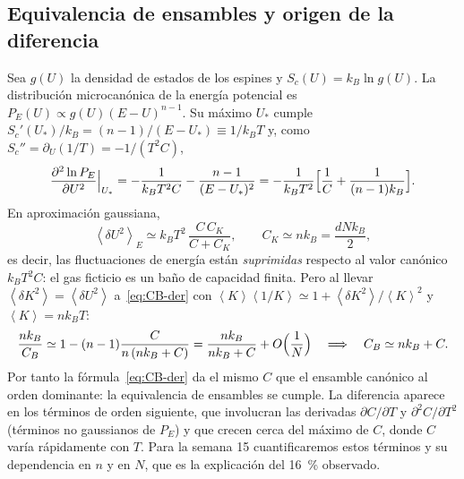 \documentclass[11pt,letterpaper]{article}
\newcommand{\avg}[1]{\left\langle #1 \right\rangle}
\newcommand{\kB}{k_{B}}
\begin{document}
\subsection{Equivalencia de ensambles y origen de la diferencia}
\label{sec:equiv}
Sea $g(U)$ la densidad de estados de los espines y $S_c(U)=\kB\ln g(U)$. La
distribución microcanónica de la energía potencial es
$P_E(U)\propto g(U)(E-U)^{n-1}$. Su máximo $U_*$ cumple
$S_c'(U_*)/\kB=(n-1)/(E-U_*)\equiv1/\kB T$ y, como $S_c''=\partial_U(1/T)=-1/(T^2C)$,
\begin{equation}
\frac{\partial^2\ln P_E}{\partial U^2}\Big|_{U_*}=-\frac{1}{\kB T^2C}-\frac{n-1}{(E-U_*)^2}
=-\frac{1}{\kB T^2}\Bigl[\frac1C+\frac{1}{(n-1)\kB}\Bigr].
\end{equation}
En aproximación gaussiana,
\begin{equation}
\avg{\delta U^2}_E\simeq\kB T^2\,\frac{C\,C_K}{C+C_K},\qquad C_K\simeq n\kB=\frac{dN\kB}{2},
\label{eq:dU2}
\end{equation}
es decir, las fluctuaciones de energía están \emph{suprimidas} respecto al valor
canónico $\kB T^2C$: el gas ficticio es un baño de capacidad finita. Pero al llevar
$\avg{\delta K^2}=\avg{\delta U^2}$ a~\eqref{eq:CB-der} con
$\avg K\avg{1/K}\simeq1+\avg{\delta K^2}/\avg K^2$ y $\avg K=n\kB T$:
\begin{equation}
\frac{n\kB}{C_B}\simeq1-(n-1)\frac{C}{n\,(n\kB+C)}=\frac{n\kB}{n\kB+C}+O\Bigl(\frac1N\Bigr)
\quad\Longrightarrow\quad C_B\simeq n\kB+C .
\end{equation}
Por tanto la fórmula~\eqref{eq:CB-der} da el mismo $C$ que el ensamble canónico al
orden dominante: la equivalencia de ensambles se cumple. La diferencia aparece en los
términos de orden siguiente, que involucran las derivadas $\partial C/\partial T$ y
$\partial^2C/\partial T^2$ (términos no gaussianos de $P_E$) y que crecen cerca del
máximo de $C$, donde $C$ varía rápidamente con $T$. Para la semana 15 cuantificaremos
estos términos y su dependencia en $n$ y en $N$, que es la explicación del
16~\% observado.

\end{document}

